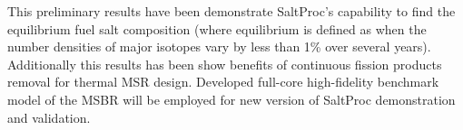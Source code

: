 This preliminary results have been demonstrate SaltProc's capability to find 
the equilibrium fuel salt 
composition (where equilibrium is defined as when the number densities of major 
isotopes vary by less than 1\% over several years). Additionally this results
has been show benefits of continuous fission products removal for 
thermal \gls{MSR} design. Developed full-core high-fidelity benchmark model 
of the \gls{MSBR} will be employed for new version of SaltProc demonstration 
and validation. 